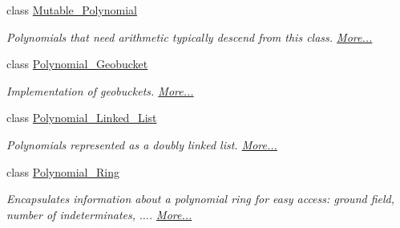 \begin{DoxyCompactItemize}
class \hyperlink{group__polygroup_class_mutable___polynomial}{Mutable\+\_\+\+Polynomial}
\begin{DoxyCompactList}\small\item\em Polynomials that need arithmetic typically descend from this class.  \hyperlink{group__polygroup_class_mutable___polynomial}{More...}\end{DoxyCompactList}\item 
class \hyperlink{group__polygroup_class_polynomial___geobucket}{Polynomial\+\_\+\+Geobucket}
\begin{DoxyCompactList}\small\item\em Implementation of geobuckets.  \hyperlink{group__polygroup_class_polynomial___geobucket}{More...}\end{DoxyCompactList}\item 
class \hyperlink{group__polygroup_class_polynomial___linked___list}{Polynomial\+\_\+\+Linked\+\_\+\+List}
\begin{DoxyCompactList}\small\item\em Polynomials represented as a doubly linked list.  \hyperlink{group__polygroup_class_polynomial___linked___list}{More...}\end{DoxyCompactList}\item 
class \hyperlink{group__polygroup_class_polynomial___ring}{Polynomial\+\_\+\+Ring}
\begin{DoxyCompactList}\small\item\em Encapsulates information about a polynomial ring for easy access\+: ground field, number of indeterminates, {$\dots$}.  \hyperlink{group__polygroup_class_polynomial___ring}{More...}\end{DoxyCompactList}\end{DoxyCompactItemize}
